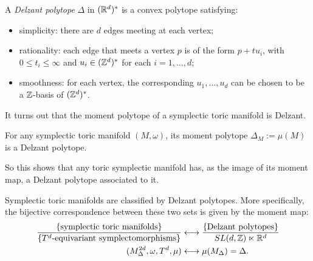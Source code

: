 \begin{defn}
	A \emph{Delzant polytope} \cite{Del88} $\Delta$ in $(\mathbb{R}^{d})^{\ast}$ is a convex polytope satisfying:
	\begin{itemize}
		\item simplicity: there are $d$ edges meeting at each vertex;
		\item rationality: each edge that meets a vertex $p$ is of the form $p + tu_{i}$, with $0 \leq t_{i} \leq \infty$ and $u_{i} \in (\mathbb{Z}^{d})^{\ast}$ for each $i = 1,\ldots, d$;
		\item smoothness: for each vertex, the corresponding $u_{1},\ldots, u_{d}$ can be chosen to be a $\mathbb{Z}$-basis of $(\mathbb{Z}^{d})^{\ast}$.
	\end{itemize}
\end{defn}

It turns out that the moment polytope of a symplectic toric manifold is Delzant.

\begin{prop}
	\label{prop:manifold-delzant}
	For any symplectic toric manifold $(M,\omega)$, its moment polytope $\Delta_{M} := \mu(M)$ is a Delzant polytope.
\end{prop}

So this shows that any toric symplectic manifold has, as the image of its moment map, a Delzant polytope associated to it.

\begin{thm}
	\label{thm:classification}
	Symplectic toric manifolds are classified by Delzant polytopes. More specifically, the bijective correspondence between these two sets is given by the moment map:
	\begin{equation*}
	\begin{split}
	\frac{\{\text{symplectic toric manifolds}\}}{\{ T^{d}\text{-equivariant symplectomorphisms}\}} &\longleftrightarrow \frac{\{\text{Delzant polytopes}\}}{SL(d,\mathbb{Z}) \ltimes \mathbb{R}^{d}}\\
	(M^{2d}_{\Delta}, \omega, T^{d}, \mu) &\longleftrightarrow \mu(M_{\Delta}) = \Delta.
	\end{split}
	\end{equation*}
\end{thm}

